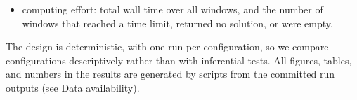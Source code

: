 \begin{itemize}
\begin{equation}
          \label{eq:continuity}
        \end{equation}
        where $d_1 < d_2 < \dots$ are the days on which block $b$ is worked and $M_{b,d}$ is the
        set of machines that produced volume on block $b$ on day $d$. The measure describes
        persistence within the stitched plan; it is not a measure of plan stability across
        re-optimization, which would compare a window's plan with the previous window's plan over
        their overlapping days. Moves are free in these scenarios, so neither method is rewarded
        for reducing them, and both measures describe incidental schedule structure rather than an
        optimized property;
  \item computing effort: total wall time over all windows, and the number of windows that
        reached a time limit, returned no solution, or were empty.
\end{itemize}
The design is deterministic, with one run per configuration, so we compare configurations
descriptively rather than with inferential tests. All figures, tables, and numbers in the results
are generated by scripts from the committed run outputs (see Data availability).
